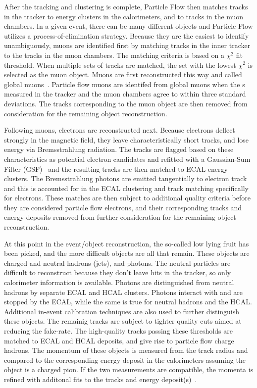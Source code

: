 After the tracking and clustering is complete, Particle Flow then matches tracks in the tracker to energy clusters in the calorimeters, and to tracks in the muon chambers.
In a given event, there can be many different objects and Particle Flow utilizes
a process-of-elimination strategy. Because they are the easiest to identify unambiguously, muons are identified first by matching tracks in the inner tracker to the tracks in
the muon chambers. The matching criteria is based on a $\chi^{2}$ fit threshold. When multiple sets of tracks are matched, the set with the lowest $\chi^{2}$ is selected as the
muon object. Muons are first reconstructed this way and called global muons~\cite{globalmuon}. Particle flow muons are identifed from global muons when the \pt s measured in the tracker and the
muon chambers agree to within three standard deviations. The tracks corresponding to the muon object are then removed from consideration for the remaining object reconstruction. 

Following muons, electrons are reconstructed next. Because electrons deflect strongly in the magnetic field, they leave characteristically short tracks, and lose energy via
Bremsstrahlung radiation. The tracks are flagged based on these characteristics as potential electron candidates and refitted with a Gaussian-Sum Filter (GSF)~\cite{gsf} and the
resulting tracks are then matched to ECAL energy clusters. The Bremsstrahlung photons are emitted tangentially to electron track and this is accounted for in the ECAL clustering
and track matching specifically for electrons. These matches are then subject to additional quality criteria before they are considered particle flow electrons, and their
corresponding tracks and energy deposits removed from further consideration for the remaining object reconstruction. 

At this point in the event/object reconstruction, the so-called low lying fruit has been picked, and the more difficult objects are all that remain. These objects are charged
and neutral hadrons (jets), and photons. The neutral particles are difficult to reconstruct because they don't leave hits in the tracker, so only calorimeter information is
available. Photons are distinguished from neutral hadrons by separate ECAL and HCAL clusters. Photons interact with and are stopped by the ECAL, while the same is true for
neutral hadrons and the HCAL. Additional in-event calibration techniques are also used to further distinguish these objects. The remainig tracks are subject to tighter
quality cuts aimed at reducing the fake-rate. The high-quality tracks passing these thresholds are matched to ECAL and HCAL deposits, and give rise to particle flow 
charge hadrons. The momentum of these objects is measured from the track radius and compared to the corresponding energy deposit in the calorimeters assuming the object is
a charged pion. If the two measurements are compatible, the momenta is refined with additonal fits to the tracks and energy deposit(s)~\cite{CMS-PFT-09-001}.

